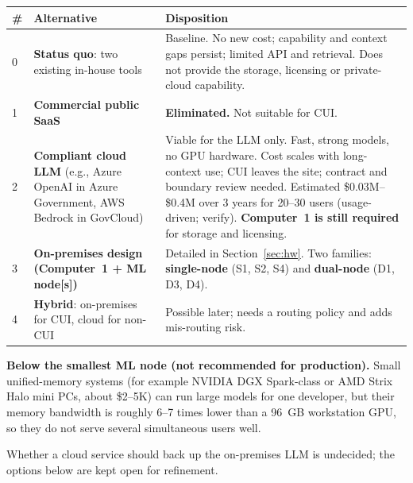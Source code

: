 
{\footnotesize
\begin{xltabular}{\textwidth}{@{}l Y{0.667} Y{1.333}@{}}
  \toprule
  \# & Alternative & Disposition \\
  \midrule
   & \textbf{Status quo}: two existing in-house tools & Baseline. No new cost; capability and context gaps persist; limited API and retrieval. Does not provide the storage, licensing or private-cloud capability. \\
  1 & \textbf{Commercial public SaaS} & \textbf{Eliminated.} Not suitable for CUI. \\
  2 & \textbf{Compliant cloud LLM} (e.g., Azure OpenAI in Azure Government, AWS Bedrock in GovCloud) & Viable for the LLM only. Fast, strong models, no GPU hardware. Cost scales with long-context use; CUI leaves the site; contract and boundary review needed. Estimated \$0.03M--\$0.4M over 3 years for 20--30 users (usage-driven; verify). \textbf{Computer~1 is still required} for storage and licensing. \\
  3 & \textbf{On-premises design (Computer~1 + ML node[s])} & Detailed in Section~\ref{sec:hw}. Two families: \textbf{single-node} (S1, S2, S4) and \textbf{dual-node} (D1, D3, D4). \\
  4 & \textbf{Hybrid}: on-premises for CUI, cloud for non-CUI & Possible later; needs a routing policy and adds mis-routing risk. \\
  \bottomrule
\end{xltabular}}

\textbf{Below the smallest ML node (not recommended for production).} Small
unified-memory systems (for example NVIDIA DGX Spark-class or AMD Strix Halo
mini PCs, about \$2--5K) can run large models for one developer, but their
memory bandwidth is roughly 6--7 times lower than a 96~GB workstation GPU, so
they do not serve several simultaneous users well.


Whether a cloud service should back up the on-premises LLM is undecided; the options
below are kept open for refinement.

